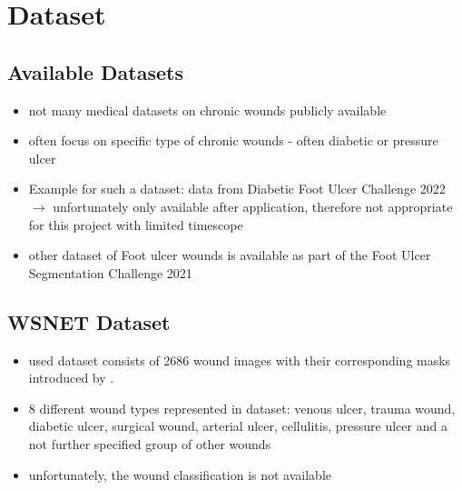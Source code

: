 \section{Dataset}

\subsection{Available Datasets}
\begin{itemize}
	\item not many medical datasets on chronic wounds publicly available \cite{Oota_2023_WACV}
	\item often focus on specific type of chronic wounds - often diabetic or pressure ulcer
	\item Example for such a dataset: data from Diabetic Foot Ulcer Challenge 2022 \cite{DFUC2022} $\rightarrow$ unfortunately only available after application, therefore not appropriate for this project with limited timescope
	\item other dataset of Foot ulcer wounds is available as part of the Foot Ulcer Segmentation Challenge 2021 \cite{Wang2020}
\end{itemize}

\subsection{WSNET Dataset}

\begin{itemize}
	\item used dataset consists of 2686 wound images with their corresponding masks introduced by \citeauthor{Oota_2023_WACV} \cite{Oota_2023_WACV}.
	\item 8 different wound types represented in dataset: venous ulcer, trauma wound, diabetic ulcer, surgical wound, arterial ulcer, cellulitis, pressure ulcer and a not further specified group of other wounds
	\item unfortunately, the wound classification is not available
\end{itemize}